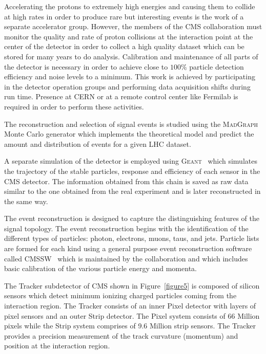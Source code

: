 \documentclass[final,3p]{CSP}
\begin{document}
\onehalfspacing Accelerating the protons to extremely high energies and causing them to collide at high rates in order to produce rare but interesting events is the work of a separate accelerator group.
However, the members of the CMS collaboration must monitor the quality and rate of proton collisions at the interaction point at the center of the detector in order to collect a high quality dataset which can be stored for many years to do analysis.
Calibration and maintenance of all parts of the detector is necessary in order to achieve close to $100\%$ particle detection efficiency and noise levels to a minimum. This work is achieved by participating in the detector operation groups and performing data acquisition shifts during run time.  
Presence at CERN or at a remote control center like Fermilab is required in order to perform these activities. 

The reconstruction and selection of signal events is studied using the \textsc{MadGraph}~\cite{alwall2014automated} Monte Carlo generator which implements the theoretical model and predict the amount and distribution of events for a given LHC dataset.



A separate simulation of the detector is employed using \textsc{Geant}~\cite{agostinelli2003geant4} which simulates the trajectory of the stable particles, response and efficiency of each sensor in the CMS detector.
The information obtained from this chain is saved as raw data similar to the one obtained from the real experiment and is later reconstructed in the same way.

The event reconstruction is designed to capture the distinguishing features of the signal topology.
The event reconstruction begins with the identification of the different types of particles: photon, electrons, muons, taus, and jets.
Particle lists are formed for each kind using a general purpose event reconstruction software called \textsc{CMSSW}~\cite{Bayatian:922757} which is maintained by the collaboration and which includes basic calibration of the various particle energy and momenta.

The Tracker subdetector of CMS shown in Figure~\ref{figure5} is composed of silicon sensors which detect minimum ionizing charged particles coming from the interaction region. The Tracker consists of an inner Pixel detector with layers of pixel sensors and an outer Strip detector. The Pixel system consists of 66 Million pixels while the Strip system comprises of 9.6 Million strip sensors. The Tracker provides a precision measurement of the track curvature (momentum) and position at the interaction region.
\end{document}
